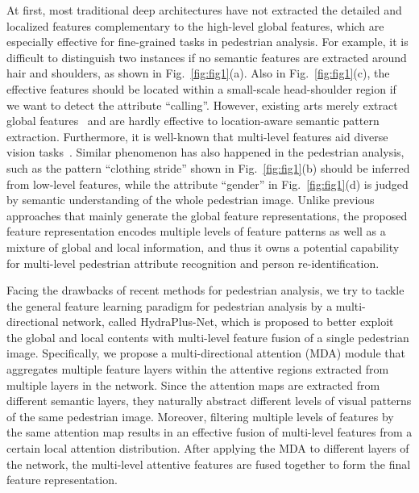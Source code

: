 \documentclass[10pt,twocolumn,letterpaper]{article}
\begin{document}
At first, most traditional deep architectures have not extracted the detailed and localized features complementary to the high-level global features, which are especially effective for fine-grained tasks in pedestrian analysis.
%
For example, it is difficult to distinguish two instances if no semantic features are extracted around hair and shoulders, as shown in Fig.~\ref{fig:fig1}(a).
%
Also in Fig.~\ref{fig:fig1}(c), the effective features should be located within a small-scale head-shoulder region if we want to detect the attribute ``calling''.
%
However, existing arts merely extract global features~\cite{li2015multi, sudowe2015person, xiao2016learning} and are hardly effective to location-aware semantic pattern extraction.
%
Furthermore, it is well-known that multi-level features aid diverse vision tasks~\cite{newell2016stacked,cornia2016deep}.
%
Similar phenomenon has also happened in the pedestrian analysis, such as the pattern ``clothing stride'' shown in Fig.~\ref{fig:fig1}(b) should be inferred from low-level features, while the attribute ``gender'' in Fig.~\ref{fig:fig1}(d) is judged by semantic understanding of the whole pedestrian image.
%
Unlike previous approaches that mainly generate the global feature representations, the proposed feature representation encodes multiple levels of feature patterns as well as a mixture of global and local information, and thus it owns a potential capability for multi-level pedestrian attribute recognition and person re-identification.



Facing the drawbacks of recent methods for pedestrian analysis, we try to tackle the general feature learning paradigm for pedestrian analysis by a multi-directional network, called HydraPlus-Net, which is proposed to better exploit the global and local contents with multi-level feature fusion of a single pedestrian image.
%
Specifically, we propose a multi-directional attention (MDA) module that aggregates multiple feature layers within the attentive regions extracted from multiple layers in the network.
%
Since the attention maps are extracted from different semantic layers, they naturally abstract different levels of visual patterns of the same pedestrian image.
%
Moreover, filtering multiple levels of features by the same attention map results in an effective fusion of multi-level features from a certain local attention distribution.
%
After applying the MDA to different layers of the network, the multi-level attentive features are fused together to form the final feature representation.
\end{document}
